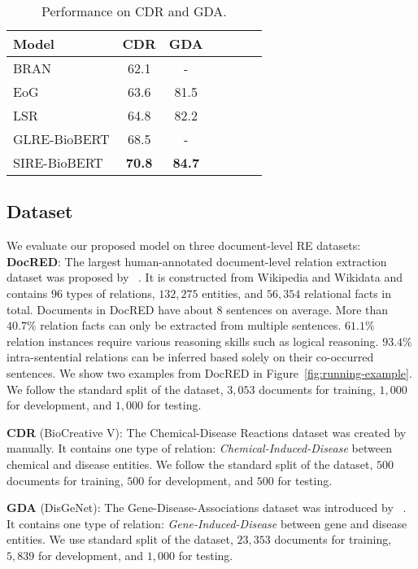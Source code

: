 \documentclass[11pt,a4paper]{article}
\begin{document}
\begin{table}[htbp]
\centering
\small
\begin{tabular}{lcccccc}
\hline
\bf Model  & \bf CDR  & \bf GDA \\ 
\hline
BRAN \citep{BRAN} & 62.1 & - \\
EoG \citep{GLRE} & 63.6 & 81.5 \\
LSR \citep{LSR} & 64.8 & 82.2 \\
GLRE-BioBERT \citep{GLRE} & 68.5 & - \\
\hline
SIRE-BioBERT & \textbf{70.8} & \textbf{84.7} \\
\hline
\end{tabular}
\caption{Performance on CDR and GDA.
}
\label{table:results2}
\end{table}

\subsection{Dataset}
We evaluate our proposed model on three document-level RE datasets: \\
\textbf{DocRED}: 
The largest human-annotated document-level relation extraction dataset was proposed by ~\citet{DocRED-paper}. It is constructed from Wikipedia and Wikidata and contains $96$ types of relations, $132,275$ entities, and $56,354$ relational facts in total. Documents in DocRED have about $8$ sentences on average. More than $40.7\%$ relation facts can only be extracted from multiple sentences.
$61.1\%$ relation instances require various reasoning skills such as logical reasoning. $93.4\%$ intra-sentential relations can be inferred based solely on their co-occurred sentences. We show two examples from DocRED in Figure~\ref{fig:running-example}. We follow the standard split of the dataset, $3,053$ documents for training, $1,000$ for development, and $1,000$ for testing. 

\noindent
\textbf{CDR} (BioCreative V): The Chemical-Disease Reactions dataset was created by ~\citet{CDR} manually. It contains one type of relation: \textit{Chemical-Induced-Disease} between chemical and disease entities. We follow the standard split of the dataset, $500$ documents for training, $500$ for development, and $500$ for testing. 

\noindent
\textbf{GDA} (DisGeNet): The Gene-Disease-Associations dataset was introduced by ~\citet{GDA}.
It contains one type of relation: \textit{Gene-Induced-Disease} between gene and disease entities.
We use standard split of the dataset, $23,353$ documents for training, $5,839$ for development, and $1,000$ for testing. 
\end{document}
